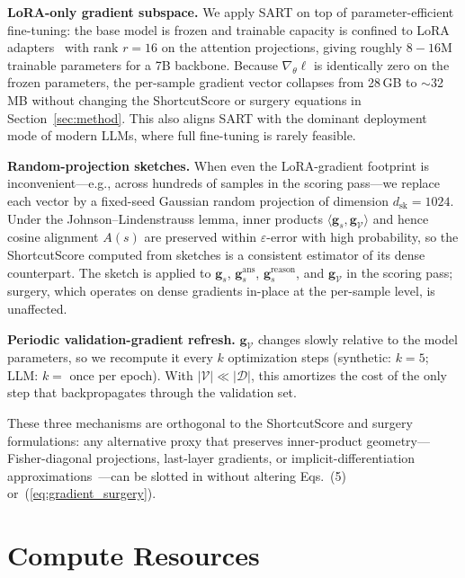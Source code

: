 \noindent\textbf{LoRA-only gradient subspace.}
We apply SART on top of parameter-efficient fine-tuning: the base model is frozen and trainable capacity is confined to LoRA adapters~\cite{hu2022lora} with rank $r{=}16$ on the attention projections, giving roughly $8{-}16$M trainable parameters for a 7B backbone. Because $\nabla_\theta \ell$ is identically zero on the frozen parameters, the per-sample gradient vector collapses from 28\,GB to $\sim$32\,MB without changing the ShortcutScore or surgery equations in Section~\ref{sec:method}. This also aligns SART with the dominant deployment mode of modern LLMs, where full fine-tuning is rarely feasible.

\noindent\textbf{Random-projection sketches.}
When even the LoRA-gradient footprint is inconvenient---e.g., across hundreds of samples in the scoring pass---we replace each vector by a fixed-seed Gaussian random projection of dimension $d_{\mathrm{sk}}{=}1024$. Under the Johnson--Lindenstrauss lemma, inner products $\langle \mathbf{g}_s, \mathbf{g}_{\mathcal{V}}\rangle$ and hence cosine alignment $A(s)$ are preserved within $\varepsilon$-error with high probability, so the ShortcutScore computed from sketches is a consistent estimator of its dense counterpart. The sketch is applied to $\mathbf{g}_s$, $\mathbf{g}_s^{\mathrm{ans}}$, $\mathbf{g}_s^{\mathrm{reason}}$, and $\mathbf{g}_{\mathcal{V}}$ in the scoring pass; surgery, which operates on dense gradients in-place at the per-sample level, is unaffected.

\noindent\textbf{Periodic validation-gradient refresh.}
$\mathbf{g}_{\mathcal{V}}$ changes slowly relative to the model parameters, so we recompute it every $k$ optimization steps (synthetic: $k{=}5$; LLM: $k{=}$ once per epoch). With $|\mathcal{V}|{\ll}|\mathcal{D}|$, this amortizes the cost of the only step that backpropagates through the validation set.

These three mechanisms are orthogonal to the ShortcutScore and surgery formulations: any alternative proxy that preserves inner-product geometry---Fisher-diagonal projections, last-layer gradients, or implicit-differentiation approximations~\cite{koh2020understandingblackboxpredictionsinfluence}---can be slotted in without altering Eqs.~(5) or~(\ref{eq:gradient_surgery}).

\section{Compute Resources}
\label{sec:appendix_compute}

